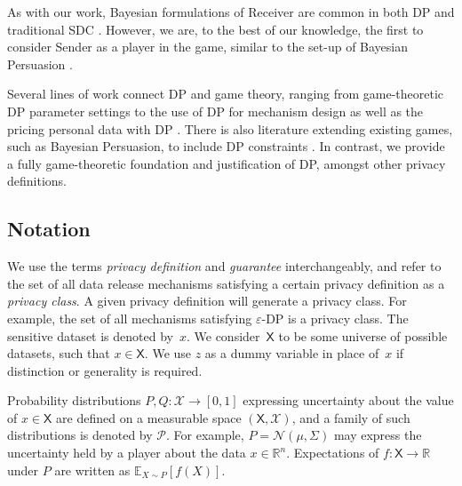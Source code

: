 \documentclass{article}
\theoremstyle{plain}
\theoremstyle{plain}
\theoremstyle{definition}
\theoremstyle{remark}
\theoremstyle{plain}
\newcommand{\xset}{\mathsf{X}}
\begin{document}
As with our work, Bayesian formulations of Receiver are common in both DP \citep[see e.g.,][]{dwork2006puredp, kiferPufferfishFrameworkMathematical2014, kiferNoFreeLunch2011, kasiviswanathanSemanticsDifferentialPrivacy2014, kiferBayesianFrequentistSemantics2022} and traditional SDC \citep[see e.g.,][]{fienbergBayesianApproachData1997, dobraAssessingRiskDisclosure2003}.
However, we are, to the best of our knowledge, the first to consider Sender as a player in the game, similar to the set-up of Bayesian Persuasion \citep{kamenica2011bayesian}. 

Several lines of work connect DP and game theory, ranging from game-theoretic DP parameter settings \citep{kohliEpsilonVotingMechanism2018, hsuDifferentialPrivacyEconomic2014} to the use of DP for mechanism design \citep{mcsherryMechanismDesignDifferential2007, nissimApproximatelyOptimalMechanism2012, paiPrivacyMechanismDesign2013} as well as the pricing personal data with DP \citep{ghoshSellingPrivacyAuction2015, dandekarPrivacyAuctionsRecommender2014, rothConductingTruthfulSurveys2012, fleischerApproximatelyOptimalAuctions2012, ligettTakeItLeave2012, liTheoryPricingPrivate2017}. There is also literature extending existing games, such as Bayesian Persuasion, to include DP constraints \citep{panDifferentiallyPrivateBayesian2025}. In contrast, we provide a fully game-theoretic foundation and justification of DP, amongst other privacy definitions. 

\subsection{Notation}

We use the terms \textit{privacy definition} and \textit{guarantee} interchangeably, and refer to the set of all data release mechanisms satisfying a certain privacy definition as a \textit{privacy class}. A given privacy definition will generate a privacy class. For example, the set of all mechanisms satisfying $\varepsilon$-DP is a privacy class. The sensitive dataset is denoted by~$x$. We consider~$\xset$ to be some universe of possible datasets, such that $x \in \xset$. We use $z$ as a dummy variable in place of~$x$ if distinction or generality is required.

Probability distributions $P, Q:\mathcal{X} \rightarrow [0,1]$ expressing uncertainty about the value of $x \in \xset$ are defined on a measurable space $(\mathsf{X},\mathcal{X})$, and a family of such distributions is denoted by $\mathcal P$. For example, $P = \mathcal{N}(\mu,\Sigma)$ may express the uncertainty held by a player about the data $x \in \mathbb{R}^n$.  Expectations of $f:\mathsf{X} \rightarrow\mathbb{R}$ under $P$ are written as $\mathbb{E}_{X\sim P}[f(X)]$.
\end{document}
